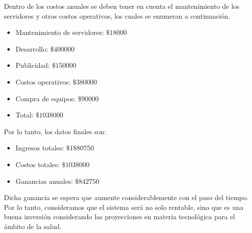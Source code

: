 \documentclass[a4paper,10pt]{article}
\begin{document}
Dentro de los costos anuales se deben tener en cuenta el mantenimiento de los servidores y otros costos operativos, los cuales se enumeran a continuación.

\begin{itemize}
\item Mantenimiento de servidores: $\$18000$
\item Desarrollo: $\$400000$
\item Publicidad: $\$150000$
\item Costos operativos: $\$380000$
\item Compra de equipos: $\$90000$
\item Total: $\$1038000$
\end{itemize}

Por lo tanto, los datos finales son:
\begin{itemize}
\item Ingresos totales: $\$1880750$
\item Costos totales: $\$1038000$
\item Ganancias anuales: $\$842750$
\end{itemize}

Dicha ganancia se espera que aumente considerablemente con el paso del tiempo. Por lo tanto, consideramos que el sistema será no solo rentable, sino que es una buena inversión considerando las proyecciones en materia tecnológica para el ámbito de la salud.

\newpage
\end{document}
